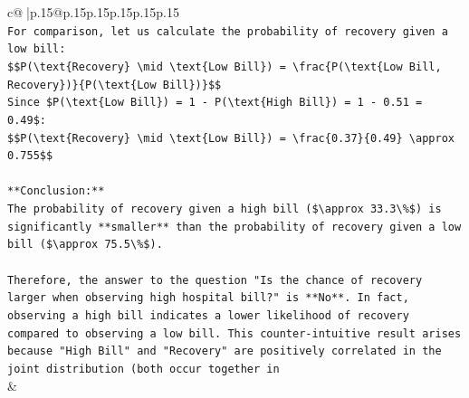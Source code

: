 \documentclass{article}
\begin{document}
{\begin{supertabular}{c@{$\;$}|p{.15\linewidth}@{}p{.15\linewidth}p{.15\linewidth}p{.15\linewidth}p{.15\linewidth}p{.15\linewidth}}
{{{\\ 
\texttt{For comparison, let us calculate the probability of recovery given a low bill:} \\
\texttt{\$\$P(\textbackslash{}text\{Recovery\} \textbackslash{}mid \textbackslash{}text\{Low Bill\}) = \textbackslash{}frac\{P(\textbackslash{}text\{Low Bill, Recovery\})\}\{P(\textbackslash{}text\{Low Bill\})\}\$\$} \\
\texttt{Since \$P(\textbackslash{}text\{Low Bill\}) = 1 {-} P(\textbackslash{}text\{High Bill\}) = 1 {-} 0.51 = 0.49\$:} \\
\texttt{\$\$P(\textbackslash{}text\{Recovery\} \textbackslash{}mid \textbackslash{}text\{Low Bill\}) = \textbackslash{}frac\{0.37\}\{0.49\} \textbackslash{}approx 0.755\$\$} \\
\\ 
\texttt{**Conclusion:**} \\
\texttt{The probability of recovery given a high bill (\$\textbackslash{}approx 33.3\textbackslash{}\%\$) is significantly **smaller** than the probability of recovery given a low bill (\$\textbackslash{}approx 75.5\textbackslash{}\%\$).} \\
\\ 
\texttt{Therefore, the answer to the question "Is the chance of recovery larger when observing high hospital bill?" is **No**. In fact, observing a high bill indicates a lower likelihood of recovery compared to observing a low bill. This counter{-}intuitive result arises because "High Bill" and "Recovery" are positively correlated in the joint distribution (both occur together in} \\
            }
        }
    }
    & \\ \\


\end{supertabular}}
\end{document}
